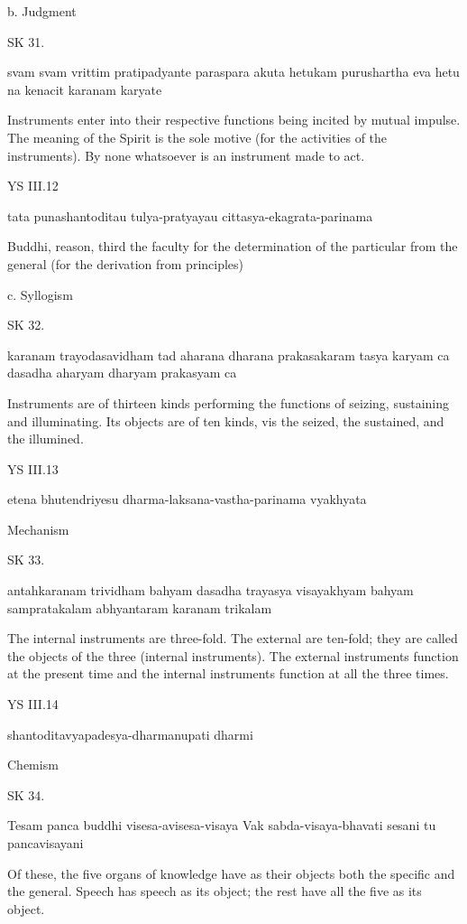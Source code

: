     b. Judgment

SK 31.

svam svam vrittim pratipadyante paraspara akuta hetukam
purushartha eva hetu na kenacit karanam karyate

Instruments enter into their respective functions being incited by mutual impulse.
The meaning of the Spirit is the sole motive (for the activities of the instruments).
By none whatsoever is an instrument made to act.

YS III.12

    tata punashantoditau tulya-pratyayau cittasya-ekagrata-parinama

    Buddhi, reason, third the faculty for the determination of
    the particular from the general (for the derivation from principles)

    c. Syllogism

SK 32.

karanam trayodasavidham tad aharana dharana prakasakaram
tasya karyam ca dasadha aharyam dharyam prakasyam ca

Instruments are of thirteen kinds performing the functions of
seizing, sustaining and illuminating.
Its objects are of ten kinds, vis
the seized, the sustained, and the illumined.

YS III.13

    etena bhutendriyesu dharma-laksana-vastha-parinama vyakhyata

    Mechanism

SK 33.

antahkaranam trividham bahyam dasadha trayasya visayakhyam
bahyam sampratakalam abhyantaram karanam trikalam

The internal instruments are three-fold.
The external are ten-fold; they are called the objects of the three (internal instruments).
The external instruments function at the present time and
the internal instruments function at all the three times.

YS III.14

    shantoditavyapadesya-dharmanupati dharmi

    Chemism

SK 34.

Tesam panca buddhi visesa-avisesa-visaya
Vak sabda-visaya-bhavati sesani tu pancavisayani

Of these, the five organs of knowledge have as their objects
both the specific and the general.
Speech has speech as its object;
the rest have all the five as its object.

